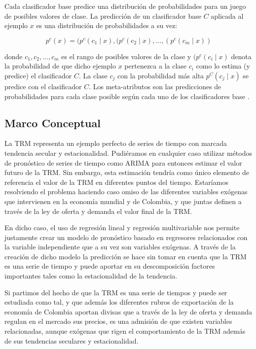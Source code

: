 \begin{spacing}{1.5}
Cada clasificador base predice una distribución de probabilidades para un juego de posibles valores de clase. La predicción de un clasificador base $C$ aplicada al ejemplo $x$ es una distribución de probabilidades a su vez:

\[ p^c(x) = (p^c(c_1 \mid x), (p^c(c_2 \mid x), \ldots, (p^c(c_m \mid x)) \]

donde ${c_{1}, c_{2}, \ldots, c_m}$ es el rango de posibles valores de la clase y $(p^c(c_i \mid x)$ denota la probabilidad de que dicho ejemplo $x$ pertenezca a la clase $c_i$ como lo estima (y predice) el clasificador $C$. La clase $c_j$ con la probabilidad más alta $p^C(c_j \mid x)$ se predice con el clasificador $C$. Los meta-atributos son las predicciones de probabilidades para cada clase posible según cada uno de los clasificadores base \cite{DzeroskiZenko}. 

\subsection{Marco Conceptual}
La TRM representa un ejemplo perfecto de series de tiempo con marcada tendencia secular y estacionalidad. Pudiéramos en cualquier caso utilizar métodos de pronóstico de series de tiempo como ARIMA para entonces estimar el valor futuro de la TRM. Sin embargo, esta estimación tendría como único elemento de referencia el valor de la TRM en diferentes puntos del tiempo. Estaríamos resolviendo el problema haciendo caso omiso de las diferentes variables exógenas que intervienen en la economía mundial y de Colombia, y que juntas definen a través de la ley de oferta y demanda el valor final de la TRM.
 
En dicho caso, el uso de regresión lineal y regresión multivariable nos permite justamente crear un modelo de pronóstico basado en regresores relacionados con la variable independiente que a su vez son variables exógenas. A través de la creación de dicho modelo la predicción se hace sin tomar en cuenta que la TRM es una serie de tiempo y puede aportar en su descomposición factores importantes tales como la estacionalidad de la tendencia.
 
Si partimos del hecho de que la TRM es una serie de tiempos y puede ser estudiada como tal, y que además los diferentes rubros de exportación de la economía de Colombia aportan divisas que a través de la ley de oferta y demanda regulan en el mercado sus precios, es una admisión de que existen variables relacionadas, aunque exógenas que rigen el comportamiento de la TRM además de sus tendencias seculares y estacionalidad.
 

\end{spacing}

